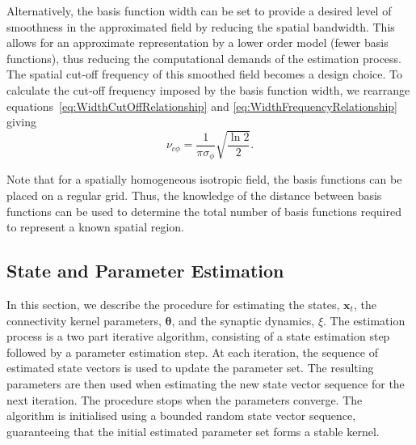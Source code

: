 \documentclass[12pt]{iopart}
\begin{document}
Alternatively, the basis function width can be set to provide a desired level of smoothness in the approximated field by reducing the spatial bandwidth. This allows for an approximate representation by a lower order model (fewer basis functions), thus reducing the computational demands of the estimation process. The spatial cut-off frequency of this smoothed field becomes a design choice. To calculate the cut-off frequency imposed by the basis function width, we rearrange equations~\ref{eq:WidthCutOffRelationship} and \ref{eq:WidthFrequencyRelationship} giving
\begin{equation}\label{eq:CutoffFromBasisFuncWidth}
	\nu_{c\phi}=\frac{1}{\pi\sigma_{\phi}}\sqrt{\frac{\ln2}{2}}.
\end{equation} 

Note that for a spatially homogeneous isotropic field, the basis functions can be placed on a regular grid. Thus, the knowledge of the distance between basis functions can be used to determine the total number of basis functions required to represent a known spatial region.

\subsection{State and Parameter Estimation}\label{StateAndParameterEstimationSection} In this section, we describe the procedure for estimating the states, $\mathbf{x}_t$, the connectivity kernel parameters, $\boldsymbol \theta$, and the synaptic dynamics, $\xi$. The estimation process is a two part iterative algorithm, consisting of a state estimation step followed by a parameter estimation step. At each iteration, the sequence of estimated state vectors is used to update the parameter set. The resulting parameters are then used when estimating the new state vector sequence for the next iteration. The procedure stops when the parameters converge. The algorithm is initialised using a bounded random state vector sequence, guaranteeing that the initial estimated parameter set forms a stable kernel.
\end{document}
